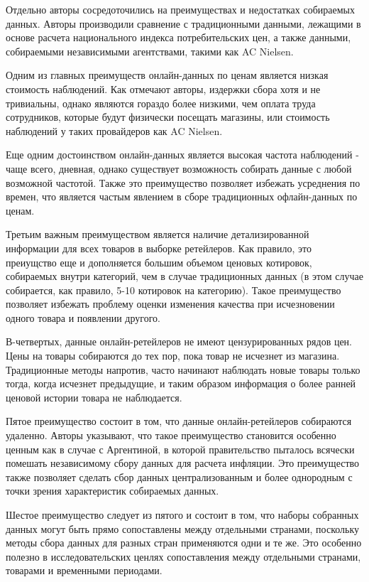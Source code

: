 Отдельно авторы сосредоточились на преимуществах и недостатках собираемых данных. Авторы производили сравнение с традиционными данными, лежащими в основе расчета национального индекса потребительских цен, а также данными, собираемыми независимыми агентствами, такими как AC Nielsen. 

Одним из главных преимуществ онлайн-данных по ценам является низкая стоимость наблюдений. Как отмечают авторы, издержки сбора хотя и не тривиальны, однако являются гораздо более низкими, чем оплата труда сотрудников, которые будут физически посещать магазины, или стоимость наблюдений у таких провайдеров как AC Nielsen.

Еще одним достоинством онлайн-данных является высокая частота наблюдений - чаще всего, дневная, однако существует возможность собирать данные с любой возможной частотой. Также это преимущество позволяет избежать усреднения по времен, что является частым явлением в сборе традиционных офлайн-данных по ценам.

Третьим важным преимуществом является наличие детализированной информации для всех товаров в выборке ретейлеров. Как правило, это преиущство еще и дополняется большим объемом ценовых котировок, собираемых внутри категорий, чем в случае традиционных данных (в этом случае собирается, как правило, 5-10 котировок на категорию). Такое преимущество позволяет избежать проблему оценки изменения качества при исчезновении одного товара и появлении другого.

В-четвертых, данные онлайн-ретейлеров не имеют цензурированных рядов цен. Цены на товары собираются до тех пор, пока товар не исчезнет из магазина. Традиционные методы напротив, часто начинают наблюдать новые товары только тогда, когда исчезнет предыдущие, и таким образом информация о более ранней ценовой истории товара не наблюдается.

Пятое преимущество состоит в том, что данные онлайн-ретейлеров собираются удаленно. Авторы указывают, что такое преимущество становится особенно ценным как в случае с Аргентиной, в которой правительство пыталось всячески помешать независимому сбору данных для расчета инфляции. Это преимущество также позволяет сделать сбор данных централизованным и более однородным с точки зрения характеристик собираемых данных.

Шестое преимущество следует из пятого и состоит в том, что наборы собранных данных могут быть прямо сопоставлены между отдельными странами, поскольку методы сбора данных для разных стран применяются одни и те же. Это особенно полезно в исследовательских ценлях сопоставления между отдельными странами, товарами и временными периодами.

